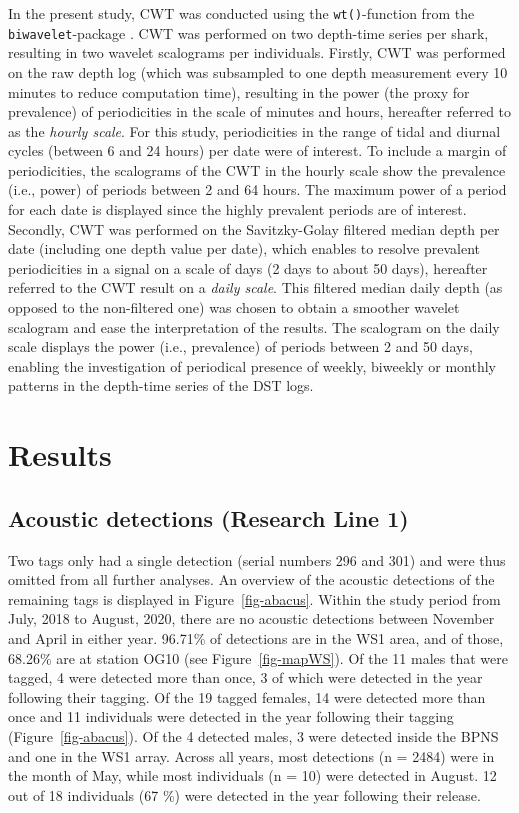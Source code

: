 \documentclass[
  authoryear,
  review,
  3p]{elsarticle}
\begin{document}
In the present study, CWT was conducted using the \texttt{wt()}-function
from the \texttt{biwavelet}-package \citep{biwavelet}. CWT was performed
on two depth-time series per shark, resulting in two wavelet scalograms
per individuals. Firstly, CWT was performed on the raw depth log (which
was subsampled to one depth measurement every 10 minutes to reduce
computation time), resulting in the power (the proxy for prevalence) of
periodicities in the scale of minutes and hours, hereafter referred to
as the \emph{hourly scale}. For this study, periodicities in the range
of tidal and diurnal cycles (between 6 and 24 hours) per date were of
interest. To include a margin of periodicities, the scalograms of the
CWT in the hourly scale show the prevalence (i.e., power) of periods
between 2 and 64 hours. The maximum power of a period for each date is
displayed since the highly prevalent periods are of interest. Secondly,
CWT was performed on the Savitzky-Golay filtered median depth per date
(including one depth value per date), which enables to resolve prevalent
periodicities in a signal on a scale of days (2 days to about 50 days),
hereafter referred to the CWT result on a \emph{daily scale}. This
filtered median daily depth (as opposed to the non-filtered one) was
chosen to obtain a smoother wavelet scalogram and ease the
interpretation of the results. The scalogram on the daily scale displays
the power (i.e., prevalence) of periods between 2 and 50 days, enabling
the investigation of periodical presence of weekly, biweekly or monthly
patterns in the depth-time series of the DST logs.

\newpage{}

\hypertarget{sec-results}{%
\section{Results}\label{sec-results}}

\hypertarget{sec-res-acoustic}{%
\subsection{Acoustic detections (Research Line
1)}\label{sec-res-acoustic}}

Two tags only had a single detection (serial numbers 296 and 301) and
were thus omitted from all further analyses. An overview of the acoustic
detections of the remaining tags is displayed in
Figure~\ref{fig-abacus}. Within the study period from July, 2018 to
August, 2020, there are no acoustic detections between November and
April in either year. 96.71\% of detections are in the WS1 area, and of
those, 68.26\% are at station OG10 (see Figure~\ref{fig-mapWS}). Of the
11 males that were tagged, 4 were detected more than once, 3 of which
were detected in the year following their tagging. Of the 19 tagged
females, 14 were detected more than once and 11 individuals were
detected in the year following their tagging (Figure~\ref{fig-abacus}).
Of the 4 detected males, 3 were detected inside the BPNS and one in the
WS1 array. Across all years, most detections (n = 2484) were in the
month of May, while most individuals (n = 10) were detected in August.
12 out of 18 individuals (67 \%) were detected in the year following
their release.
\end{document}
